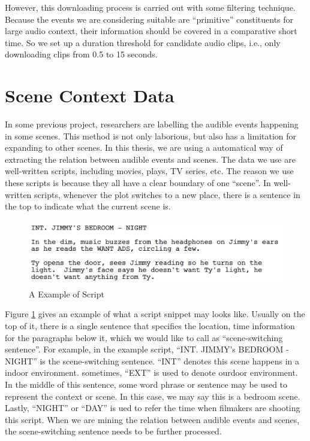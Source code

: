 However, this downloading process is carried out with some filtering technique. 
Because the events we are considering suitable are ``primitive'' constituents for large audio context, their information should be covered in a comparative short time. 
So we set up a duration threshold for candidate audio clips, i.e., only downloading clips from 0.5 to 15 seconds.  

\section{Scene Context Data}
In some previous project, researchers are labelling the audible events happening in some scenes. 
This method is not only laborious, but also has a limitation for expanding to other scenes.
In this thesis, we are using a automatical way of extracting the relation between audible events and scenes.
The data we use are well-written scripts, including movies, plays, TV series, etc. 
The reason we use these scripts is because they all have a clear boundary of one ``scene''. 
In well-written scripts, whenever the plot switches to a new place, there is a sentence in the top to indicate what the current scene is. 
\begin{figure}[htb]
\centering
\includegraphics[scale=0.6]{figure/dataprep/script}
\caption{A Example of Script}
\label{fig:script}
\end{figure}

Figure \ref{fig:script} gives an example of what a script snippet may looks like. Usually on the top of it, there is a single sentence that specifies the location, time information for the paragraphs below it, which we would like to call as ``scene-switching sentence''. 
For example, in the example script, ``INT. JIMMY's BEDROOM - NIGHT'' is the scene-switching sentence. 
``INT'' denotes this scene happens in a indoor environment. 
sometimes, ``EXT'' is used to denote ourdoor environment. 
In the middle of this sentence, some word phrase or sentence may be used to represent the context or scene. 
In this case, we may say this is a bedroom scene. 
Lastly, ``NIGHT'' or ``DAY'' is ued to refer the time when filmakers are shooting this script. 
When we are mining the relation between audible events and scenes, the scene-switching sentence needs to be further processed. 

